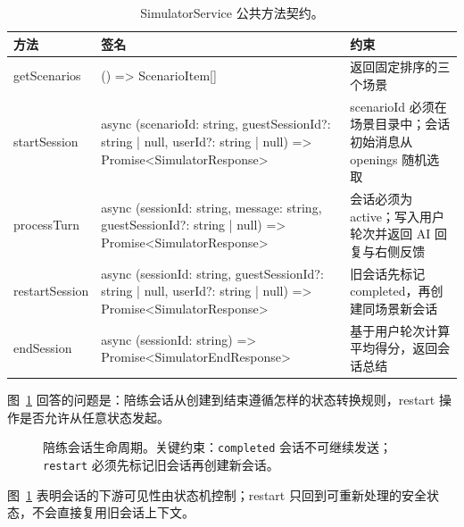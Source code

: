 \begin{table}[H]
  \centering
  \caption{SimulatorService 公共方法契约。}
  \label{tab:simulator-service-contract}
  \begin{tabularx}{\textwidth}{>{\raggedright\arraybackslash}p{3.2cm} >{\raggedright\arraybackslash}X >{\raggedright\arraybackslash}p{3.5cm}}
    \toprule
    方法 & 签名 & 约束 \\
    \midrule
    getScenarios & () => ScenarioItem[] & 返回固定排序的三个场景 \\
    startSession & async (scenarioId: string, guestSessionId?: string | null, userId?: string | null) => Promise<SimulatorResponse> & scenarioId 必须在场景目录中；会话初始消息从 openings 随机选取 \\
    processTurn & async (sessionId: string, message: string, guestSessionId?: string | null) => Promise<SimulatorResponse> & 会话必须为 active；写入用户轮次并返回 AI 回复与右侧反馈 \\
    restartSession & async (sessionId: string, guestSessionId?: string | null, userId?: string | null) => Promise<SimulatorResponse> & 旧会话先标记 completed，再创建同场景新会话 \\
    endSession & async (sessionId: string) => Promise<SimulatorEndResponse> & 基于用户轮次计算平均得分，返回会话总结 \\
    \bottomrule
  \end{tabularx}
\end{table}

图~\ref{fig:pebble-session-lifecycle} 回答的问题是：陪练会话从创建到结束遵循怎样的状态转换规则，restart 操作是否允许从任意状态发起。

\begin{figure}[H]
  \centering
  
  \caption{陪练会话生命周期。关键约束：\texttt{completed} 会话不可继续发送；\texttt{restart} 必须先标记旧会话再创建新会话。}
  \label{fig:pebble-session-lifecycle}
\end{figure}

图~\ref{fig:pebble-session-lifecycle} 表明会话的下游可见性由状态机控制；restart 只回到可重新处理的安全状态，不会直接复用旧会话上下文。

